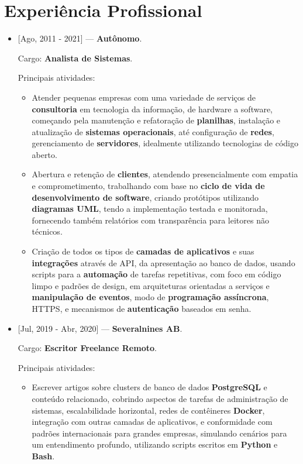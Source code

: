 \section{Experiência Profissional}

\begin{itemize}
  \item {[Ago, 2011 - 2021]} --- \textbf{Autônomo}.

    Cargo: \textbf{Analista de Sistemas}.

    Principais atividades:

    \vspace{-0.5em}
    \begin{itemize}
      \item Atender pequenas empresas com uma variedade de serviços de
        \textbf{consultoria} em tecnologia da informação, de hardware a software,
        começando pela manutenção e refatoração de \textbf{planilhas},
        instalação e atualização de \textbf{sistemas operacionais}, até
        configuração de \textbf{redes}, gerenciamento de \textbf{servidores},
        idealmente utilizando tecnologias de código aberto.
      \item Abertura e retenção de \textbf{clientes}, atendendo presencialmente
        com empatia e comprometimento, trabalhando com base no \textbf{ciclo de vida
          de desenvolvimento de software}, criando protótipos utilizando
          \textbf{diagramas UML}, tendo a implementação testada e monitorada, fornecendo
          também relatórios com transparência para leitores não técnicos.
        \item Criação de todos os tipos de \textbf{camadas de aplicativos} e suas
          \textbf{integrações} através de API, da apresentação ao banco de dados,
          usando scripts para a \textbf{automação} de tarefas repetitivas, com foco
          em código limpo e padrões de design, em arquiteturas orientadas a serviços
          e \textbf{manipulação de eventos}, modo de \textbf{programação assíncrona},
          HTTPS, e mecanismos de \textbf{autenticação} baseados em senha.
    \end{itemize}

  \item {[Jul, 2019 - Abr, 2020]} --- \textbf{Severalnines AB}.

    Cargo: \textbf{Escritor Freelance Remoto}.

    Principais atividades:

    \vspace{-0.5em}
    \begin{itemize}
      \item Escrever artigos sobre clusters de banco de dados \textbf{PostgreSQL}
        e conteúdo relacionado, cobrindo aspectos de tarefas de administração de
        sistemas, escalabilidade horizontal, redes de contêineres \textbf{Docker},
        integração com outras camadas de aplicativos, e conformidade com padrões
        internacionais para grandes empresas, simulando cenários para um
        entendimento profundo, utilizando scripts escritos em \textbf{Python} e
        \textbf{Bash}.
    \end{itemize}


\end{itemize}
